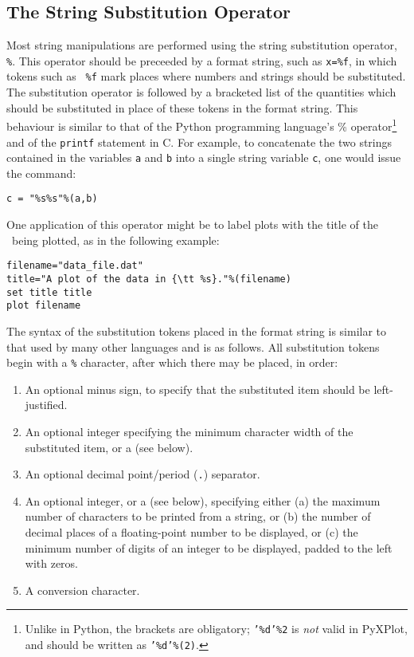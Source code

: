\subsection{The String Substitution Operator}
\label{sec:stringsubop}

Most string manipulations are performed using the string substitution operator,
{\tt \%}. This operator should be
preceeded by a format string, such as {\tt x=\%f}, in which tokens such as {\tt
\%f} mark places where numbers and strings should be substituted. The
substitution operator is followed by a bracketed list of the quantities which
should be substituted in place of these tokens in the format string. This
behaviour is similar to that of the Python programming language's \%
operator\footnote{Unlike in Python, the brackets are obligatory; {\tt '\%d'\%2}
is {\it not} valid in PyXPlot, and should be written as {\tt '\%d'\%(2)}.} and
of the {\tt printf} statement in C.  For example, to concatenate the two
strings contained in the variables {\tt a} and {\tt b} into a single string
variable {\tt c}, one would issue the command:
\begin{verbatim}
c = "%s%s"%(a,b)
\end{verbatim}

One application of this operator might be to label plots with the title of the
\datafile\ being plotted, as in the following example:
\begin{verbatim}
filename="data_file.dat"
title="A plot of the data in {\tt %s}."%(filename)
set title title
plot filename
\end{verbatim}

The syntax of the substitution tokens placed in the format string is similar to
that used by many other languages and is as follows. All substitution tokens
begin with a {\tt \%} character, after which there may be placed, in order:

\begin{enumerate}
\item An optional minus sign, to specify that the substituted item should be left-justified.
\item An optional integer specifying the minimum character width of the substituted item, or a {\tt *} (see below).
\item An optional decimal point/period ({\tt .}) separator.
\item An optional integer, or a {\tt *} (see below), specifying either (a) the maximum number of characters to be printed from a string, or (b) the number of decimal places of a floating-point number to be displayed, or (c) the minimum number of digits of an integer to be displayed, padded to the left with zeros.
\item A conversion character.
\end{enumerate}


